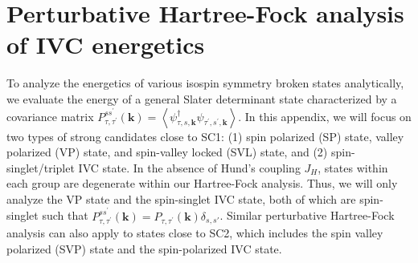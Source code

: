 \documentclass[aps,pra,twocolumn,superscriptaddress,10pt,article,nofootinbib,showpacs,longbibliography]{revtex4-1}
\begin{document}
\section{Perturbative Hartree-Fock analysis of IVC energetics}

To analyze the energetics of various isospin symmetry broken states analytically, we evaluate the energy of a general Slater determinant state characterized by a covariance matrix $P_{\tau, \tau^{\prime}}^{s s^{\prime}}(\mathbf{k})=\left\langle\psi_{\tau, s, \mathbf{k}}^{\dagger} \psi_{\tau^{\prime}, s^{\prime}, \mathbf{k}}\right\rangle$. In this appendix, we will focus on two types of strong candidates close to SC1: (1) spin polarized (SP) state, valley polarized (VP) state, and spin-valley locked (SVL) state, and (2) spin-singlet/triplet IVC state.
In the absence of Hund's coupling $J_H$, states within each group are degenerate within our Hartree-Fock analysis. Thus, we will only analyze the VP state and the spin-singlet IVC state, both of which are spin-singlet such that $P_{\tau, \tau^{\prime}}^{s s^{\prime}}(\mathbf{k}) = P_{\tau, \tau^{\prime}}(\mathbf{k}) \delta_{s,s'}$. Similar perturbative Hartree-Fock analysis can also apply to states close to SC2, which includes the spin valley polarized (SVP) state and the spin-polarized IVC state.
\end{document}
